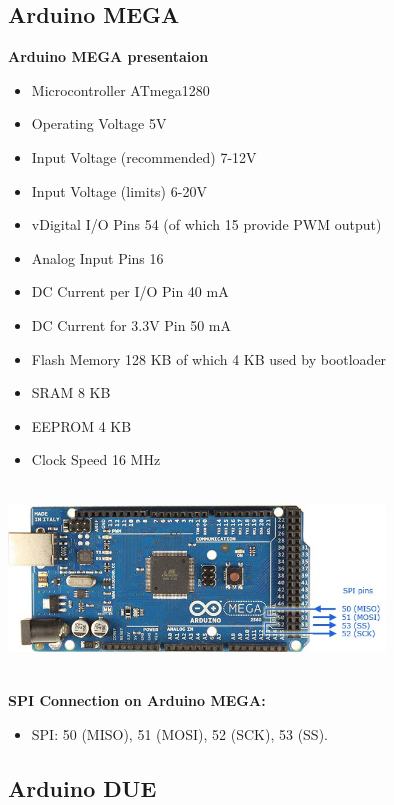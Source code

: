 \documentclass[10pt,a4paper]{report}
\begin{document}
\subsection*{Arduino MEGA}

\textbf{Arduino MEGA presentaion}\\
\begin{itemize}
\item Microcontroller	ATmega1280
\item Operating Voltage	5V
\item Input Voltage (recommended)	7-12V
\item Input Voltage (limits)	6-20V
\item vDigital I/O Pins	54 (of which 15 provide PWM output)
\item Analog Input Pins	16
\item DC Current per I/O Pin	40 mA
\item DC Current for 3.3V Pin	50 mA
\item Flash Memory	128 KB of which 4 KB used by bootloader
\item SRAM	8 KB
\item EEPROM	4 KB
\item Clock Speed	16 MHz
\end{itemize}
\begin{center}
\includegraphics[width=10cm,height=50mm]{arduinomega}\\
\end{center}
\textbf{SPI Connection on Arduino MEGA:}
\begin{itemize}
\item SPI: 50 (MISO), 51 (MOSI), 52 (SCK), 53 (SS).
\end{itemize}

\subsection{Arduino DUE}
\end{document}
